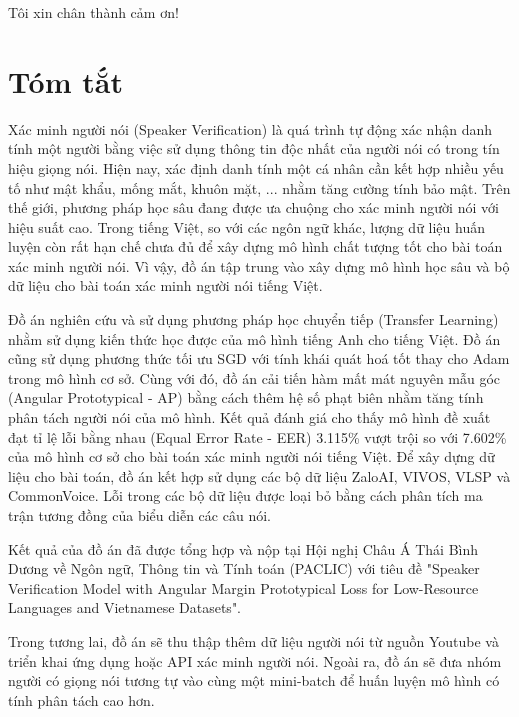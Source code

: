 \documentclass[a4paper, 13pt, oneside]{report}
\begin{document}
Tôi xin chân thành cảm ơn!

\newpage

\chapter*{\centering Tóm tắt}
Xác minh người nói (Speaker Verification) là quá trình tự động xác nhận danh tính một người bằng việc sử dụng thông tin độc nhất của người nói có trong tín hiệu giọng nói. Hiện nay, xác định danh tính một cá nhân cần kết hợp nhiều yếu tố như mật khẩu, mống mắt, khuôn mặt, ... nhằm tăng cường tính bảo mật. Trên thế giới, phương pháp học sâu đang được ưa chuộng cho xác minh người nói với hiệu suất cao. Trong tiếng Việt, so với các ngôn ngữ khác, lượng dữ liệu huấn luyện còn rất hạn chế chưa đủ để xây dựng mô hình chất tượng tốt cho bài toán xác minh người nói. Vì vậy, đồ án tập trung vào xây dựng mô hình học sâu và bộ dữ liệu cho bài toán xác minh người nói tiếng Việt.

Đồ án nghiên cứu và sử dụng phương pháp học chuyển tiếp (Transfer Learning) nhằm sử dụng kiến thức học được của mô hình tiếng Anh cho tiếng Việt. Đồ án cũng sử dụng phương thức tối ưu SGD với tính khái quát hoá tốt thay cho Adam trong mô hình cơ sở. Cùng với đó, đồ án cải tiến hàm mất mát nguyên mẫu góc (Angular Prototypical - AP) bằng cách thêm hệ số phạt biên nhằm tăng tính phân tách người nói của mô hình. Kết quả đánh giá cho thấy mô hình đề xuất đạt tỉ lệ lỗi bằng nhau (Equal Error Rate - EER) 3.115\% vượt trội so với 7.602\% của mô hình cơ sở cho bài toán xác minh người nói tiếng Việt. Để xây dựng dữ liệu cho bài toán, đồ án kết hợp sử dụng các bộ dữ liệu ZaloAI, VIVOS, VLSP và CommonVoice. Lỗi trong các bộ dữ liệu được loại bỏ bằng cách phân tích ma trận tương đồng của biểu diễn các câu nói.

Kết quả của đồ án đã được tổng hợp và nộp tại Hội nghị Châu Á Thái Bình Dương về Ngôn ngữ, Thông tin và Tính toán (PACLIC) với tiêu đề "Speaker Verification Model with Angular Margin Prototypical Loss for Low-Resource Languages and Vietnamese Datasets".

Trong tương lai, đồ án sẽ thu thập thêm dữ liệu người nói từ nguồn Youtube và triển khai ứng dụng hoặc API xác minh người nói. Ngoài ra, đồ án sẽ đưa nhóm người có giọng nói tương tự vào cùng một mini-batch để huấn luyện mô hình có tính phân tách cao hơn. 

\tableofcontents
\pagebreak
\listoffigures
\listoftables
\end{document}
